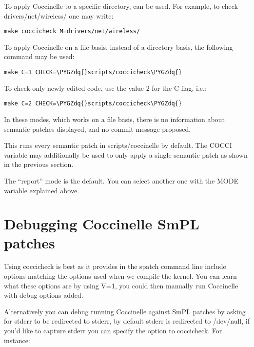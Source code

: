 \documentclass[a4paper,8pt,english]{sphinxmanual}
\def\PYGZdq{\char`\"}
\begin{document}
To apply Coccinelle to a specific directory,  can be used.
For example, to check drivers/net/wireless/ one may write:

\begin{Verbatim}[commandchars=\\\{\}]
make coccicheck M=drivers/net/wireless/
\end{Verbatim}

To apply Coccinelle on a file basis, instead of a directory basis, the
following command may be used:

\begin{Verbatim}[commandchars=\\\{\}]
make C=1 CHECK=\PYGZdq{}scripts/coccicheck\PYGZdq{}
\end{Verbatim}

To check only newly edited code, use the value 2 for the C flag, i.e.:

\begin{Verbatim}[commandchars=\\\{\}]
make C=2 CHECK=\PYGZdq{}scripts/coccicheck\PYGZdq{}
\end{Verbatim}

In these modes, which works on a file basis, there is no information
about semantic patches displayed, and no commit message proposed.

This runs every semantic patch in scripts/coccinelle by default. The
COCCI variable may additionally be used to only apply a single
semantic patch as shown in the previous section.

The ``report'' mode is the default. You can select another one with the
MODE variable explained above.


\section{Debugging Coccinelle SmPL patches}
\label{dev-tools/coccinelle:debugging-coccinelle-smpl-patches}
Using coccicheck is best as it provides in the spatch command line
include options matching the options used when we compile the kernel.
You can learn what these options are by using V=1, you could then
manually run Coccinelle with debug options added.

Alternatively you can debug running Coccinelle against SmPL patches
by asking for stderr to be redirected to stderr, by default stderr
is redirected to /dev/null, if you'd like to capture stderr you
can specify the  option to coccicheck. For
instance:
\end{document}
